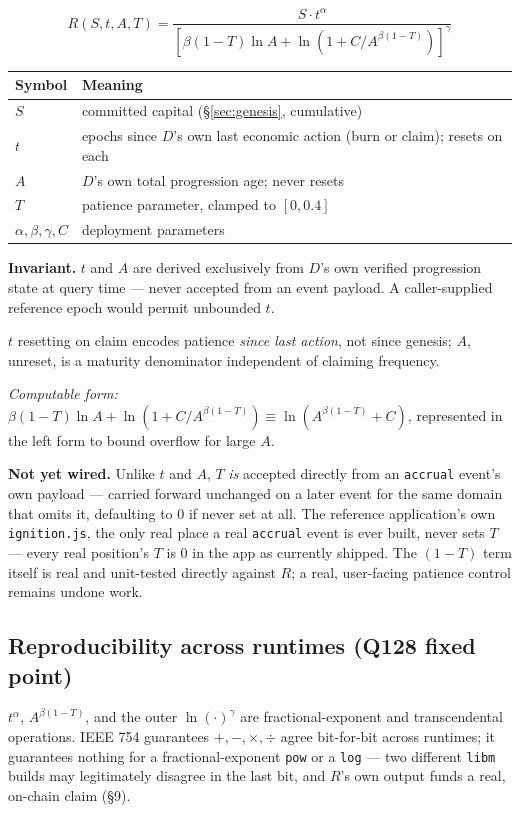 \documentclass[10pt]{article}
\newcommand{\code}[1]{\texttt{\small #1}}
\begin{document}
\[
R(S, t, A, T) = \frac{S \cdot t^{\alpha}}{\left[\beta(1-T) \ln A + \ln\left(1 + C/A^{\beta(1-T)}\right)\right]^{\gamma}}
\]

\begin{center}
\begin{tabular}{@{}ll@{}}
\toprule
Symbol & Meaning \\
\midrule
$S$ & committed capital (\S\ref{sec:genesis}, cumulative) \\
$t$ & epochs since $D$'s own last economic action (burn or claim); resets on each \\
$A$ & $D$'s own total progression age; never resets \\
$T$ & patience parameter, clamped to $[0, 0.4]$ \\
$\alpha, \beta, \gamma, C$ & deployment parameters \\
\bottomrule
\end{tabular}
\end{center}

\textbf{Invariant.} $t$ and $A$ are derived exclusively from $D$'s own verified progression state at query time --- never accepted from an event payload. A caller-supplied reference epoch would permit unbounded $t$.

$t$ resetting on claim encodes patience \emph{since last action}, not since genesis; $A$, unreset, is a maturity denominator independent of claiming frequency.

\emph{Computable form:} $\beta(1-T) \ln A + \ln(1 + C/A^{\beta(1-T)}) \equiv \ln(A^{\beta(1-T)} + C)$, represented in the left form to bound overflow for large $A$.

\textbf{Not yet wired.} Unlike $t$ and $A$, $T$ \emph{is} accepted directly from an \code{accrual} event's own payload --- carried forward unchanged on a later event for the same domain that omits it, defaulting to $0$ if never set at all. The reference application's own \code{ignition.js}, the only real place a real \code{accrual} event is ever built, never sets $T$ --- every real position's $T$ is $0$ in the app as currently shipped. The $(1-T)$ term itself is real and unit-tested directly against $R$; a real, user-facing patience control remains undone work.

\subsection{Reproducibility across runtimes (Q128 fixed point)}
\label{sec:repro}

$t^{\alpha}$, $A^{\beta(1-T)}$, and the outer $\ln(\cdot)^{\gamma}$ are fractional-exponent and transcendental operations. IEEE 754 guarantees $+, -, \times, \div$ agree bit-for-bit across runtimes; it guarantees nothing for a fractional-exponent \code{pow} or a \code{log} --- two different \code{libm} builds may legitimately disagree in the last bit, and $R$'s own output funds a real, on-chain claim (\S9).
\end{document}
